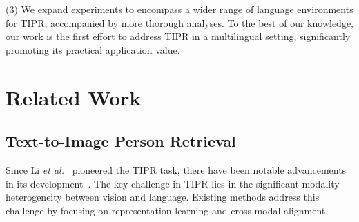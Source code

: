 \documentclass[10pt,journal,compsoc]{IEEEtran}
\begin{document}
(3) We expand experiments to encompass a wider range of language environments for TIPR, accompanied by more thorough analyses.
To the best of our knowledge, our work is the first effort to address TIPR in a multilingual setting, significantly promoting its practical application value.


\section{Related Work}
\subsection{Text-to-Image Person Retrieval}
Since Li \textit{et al.}~\cite{li2017person} pioneered the TIPR task, there have been notable advancements in its development~\cite{jiang2023cross, cao2024empirical, lin2024cross, hu2024personmae, zuo2024ufinebench}. The key challenge in TIPR lies in the significant modality heterogeneity between vision and language. Existing methods address this challenge by focusing on representation learning and cross-modal alignment.
\end{document}
